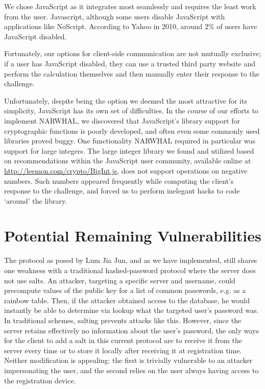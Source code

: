 \documentclass[11pt]{article}
\begin{document}
\normalsize

We chose JavaScript as it integrates most seamlessly and requires the least work from the user. Javascript, although some users disable JavaScript with applications like NoScript. According to Yahoo in 2010, around $2\%$ of users have JavaScript disabled. 

Fortunately, our options for client-side communication are not mutually exclusive; if a user has JavaScript disabled, they can use a trusted third party website and perform the calculation themselves and then manually enter their response to the challenge.

Unfortunately, despite being the option we deemed the most attractive for its simplicity, JavaScript has its own set of difficulties.  In the course of our efforts to implement NARWHAL, we discovered that JavaScript’s library support for cryptographic functions is poorly developed, and often even some commonly used libraries proved buggy.  One functionality NARWHAL required in particular was support for large integers.  The large integer library we found and utilized based on recommendations within the JavaScript user community, available online at \url{http://leemon.com/crypto/BigInt.js}, does not support operations on negative numbers.  Such numbers appeared frequently while computing the client’s response to the challenge, and forced us to perform inelegant hacks to code ‘around’ the library.


\section{Potential Remaining Vulnerabilities}

The protocol as posed by Lum Jia Jun, and as we have implemented, still shares one weakness with a traditional hashed-password protocol where the server does not use salts.  An attacker, targeting a specific server and username, could precompute values of the public key for a list of common passwords, e.g. as a rainbow table.  Then, if the attacker obtained access to the database, he would instantly be able to determine via lookup what the targeted user’s password was.  In traditional schemes, salting prevents attacks like this.  However, since the server retains effectively no information about the user’s password, the only ways for the client to add a salt in this current protocol are to receive it from the server every time or to store it locally after receiving it at registration time.  Neither modification is appealing: the first is trivially vulnerable to an attacker impersonating the user, and the second relies on the user always having access to the registration device.
\end{document}
